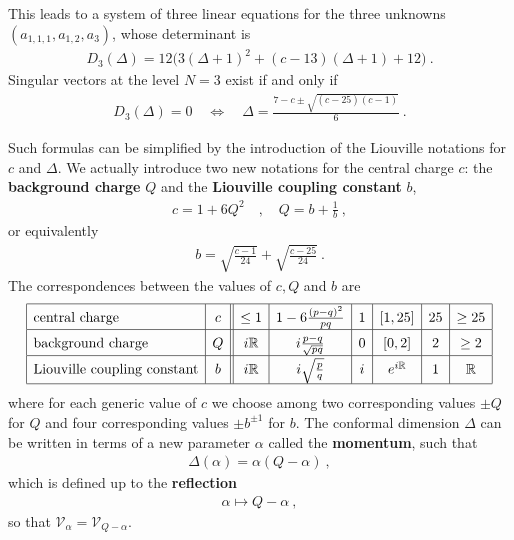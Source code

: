 \documentclass[12pt, a4paper, notitlepage, twoside]{report}
\numberwithin{equation}{section}
\theoremstyle{break}
\begin{document}
This leads to a system of three linear equations for the three unknowns $(a_{1,1,1},a_{1,2},a_3)$, whose determinant is
\begin{align}
 D_3(\Delta) = 12\Big(3(\Delta+1)^2+(c-13)(\Delta+1)+12\Big)\ .
\end{align}
Singular vectors at the level $N=3$ exist if and only if 
\begin{align}
 D_3(\Delta) = 0 \quad \Leftrightarrow \quad \Delta = \frac{7-c\pm\sqrt{(c-25)(c-1)}}{6}\ .
\end{align}

Such formulas can be simplified by the introduction of the Liouville notations for $c$ and $\Delta$.
We actually introduce two new notations for the central charge $c$: the \textbf{\boldmath background charge} $Q$ and the \textbf{\boldmath Liouville coupling constant} $b$,
\begin{align}
\boxed{ c= 1+6Q^2 }\quad , \quad \boxed{Q = b+\frac{1}{b}}\ ,
\label{cqb}
\end{align}
or equivalently
\begin{align}
 b = \sqrt{\frac{c-1}{24}} + \sqrt{\frac{c-25}{24}}\ .
\end{align}
The correspondences between the values of $c,Q$ and $b$ are 
\begin{align}
\renewcommand{\arraystretch}{1.5}
 \begin{array}{|l|c||c|c|c|c|c|c|}
  \hline
  \text{central\ charge} & c & \leq 1 & 1-6\frac{(p-q)^2}{pq} & 1 & [1,25] & 25 & \geq 25 
\\
\hline
\text{background\ charge} & Q & i{\mathbb{R}} & i\frac{p-q}{\sqrt{pq}} & 0 & [0,2] & 2 & \geq 2 
\\
\hline
\text{Liouville\ coupling\ constant} &
b& i{\mathbb{R}} & i\sqrt{\frac{p}{q}} & i & e^{i\mathbb{R}} & 1 & {\mathbb{R}}
\\
\hline
 \end{array}
\label{cqbval}
\end{align}
where for each generic value of $c$ we choose among two corresponding values $\pm Q$ for $Q$ and four corresponding values $\pm b^{\pm 1}$ for $b$.
The conformal dimension $\Delta$ can be written in terms of a 
new parameter $\alpha$ called the \textbf{\boldmath momentum}, such that 
\begin{align}
 \boxed{\Delta(\alpha) = \alpha(Q-\alpha)}\ ,
\label{daq}
\end{align}
which is defined up to the \textbf{\boldmath reflection}
\begin{align}
 \alpha \mapsto Q-\alpha\ ,
\label{arqa}
\end{align}
so that $\mathcal{V}_\alpha = \mathcal{V}_{Q-\alpha}$.
\end{document}
